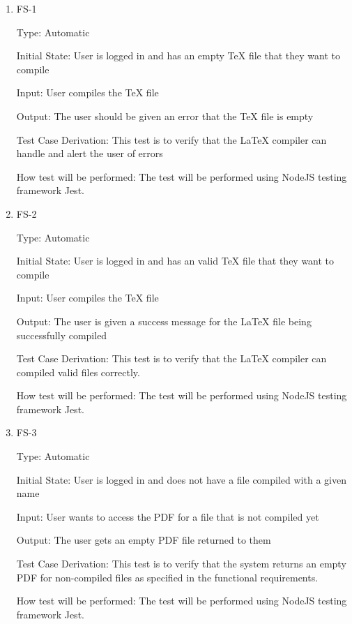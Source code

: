 \documentclass[12pt, titlepage]{article}
\begin{document}
	\begin{enumerate}
		
		\item{FS-1\\}
		
		Type: Automatic
		
		Initial State: User is logged in and has an empty TeX file that they want to compile
		
		Input: User compiles the TeX file
		
		Output: The user should be given an error that the TeX file is empty
		
		Test Case Derivation: This test is to verify that the LaTeX compiler can handle and alert the user of errors
		
		How test will be performed: The test will be performed using NodeJS testing framework Jest.
		
		\item{FS-2\\}
		
		Type: Automatic
		
		Initial State: User is logged in and has an valid TeX file that they want to compile
		
		Input: User compiles the TeX file
		
		Output: The user is given a success message for the LaTeX file being successfully compiled
		
		Test Case Derivation: This test is to verify that the LaTeX compiler can compiled valid files correctly.
		
		How test will be performed: The test will be performed using NodeJS testing framework Jest.
		
		\item{FS-3\\}
		
		Type: Automatic
		
		Initial State: User is logged in and does not have a file compiled with a given name
		
		Input: User wants to access the PDF for a file that is not compiled yet
		
		Output: The user gets an empty PDF file returned to them
		
		Test Case Derivation: This test is to verify that the system returns an empty PDF for non-compiled files as specified in the functional requirements.
		
		How test will be performed: The test will be performed using NodeJS testing framework Jest.
		

\end{enumerate}
\end{document}
